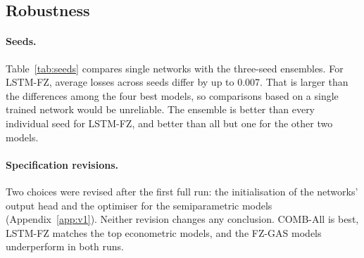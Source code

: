 \subsection{Robustness}
\paragraph{Seeds.} Table~\ref{tab:seeds} compares single networks with the three-seed ensembles. For LSTM-FZ, average losses across seeds differ by up to 0.007. That is larger than the differences among the four best models, so comparisons based on a single trained network would be unreliable. The ensemble is better than every individual seed for LSTM-FZ, and better than all but one for the other two models.

\paragraph{Specification revisions.} Two choices were revised after the first full run: the initialisation of the networks' output head and the optimiser for the semiparametric models (Appendix~\ref{app:v1}). Neither revision changes any conclusion. COMB-All is best, LSTM-FZ matches the top econometric models, and the FZ-GAS models underperform in both runs.


